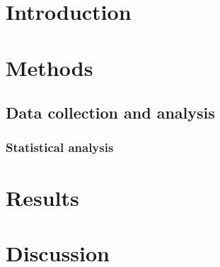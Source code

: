 \section{Introduction}
\lipsum[8]

\section{Methods}

\subsection{Data collection and analysis}

\subsubsection{Statistical analysis}

\section{Results}

\clearpage
\section{Discussion}
\lipsum[5][]
